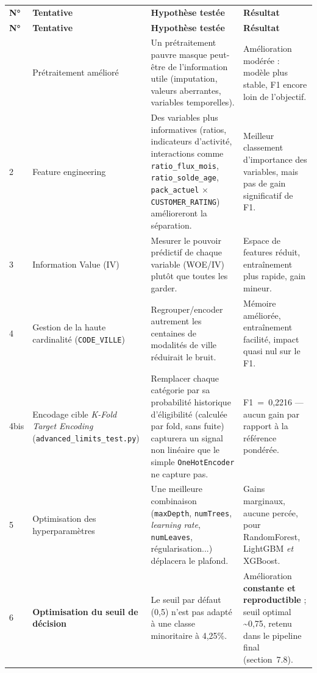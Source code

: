 \documentclass[11pt,a4paper]{report}
\let\oldtoprule\toprule
\renewcommand{\toprule}{\arrayrulecolor{corpslate}\oldtoprule\arrayrulecolor{black}}
\let\oldmidrule\midrule
\renewcommand{\midrule}{\arrayrulecolor{emsigreen}\oldmidrule\arrayrulecolor{black}}
\begin{document}
\begin{center}
\begin{longtable}{@{}p{0.7cm}p{3.4cm}p{5.3cm}p{5.3cm}@{}}
\toprule
\rowcolor{corpslate!10}
\textbf{N°} & \textbf{Tentative} & \textbf{Hypothèse testée} & \textbf{Résultat} \\
\midrule
\endfirsthead
\toprule
\rowcolor{corpslate!10}
\textbf{N°} & \textbf{Tentative} & \textbf{Hypothèse testée} & \textbf{Résultat} \\
\midrule
\endhead
1 & Prétraitement amélioré & Un prétraitement pauvre masque peut-être de l'information utile (imputation, valeurs aberrantes, variables temporelles). & Amélioration modérée : modèle plus stable, F1 encore loin de l'objectif. \\
2 & Feature engineering & Des variables plus informatives (ratios, indicateurs d'activité, interactions comme \texttt{ratio\_flux\_mois}, \texttt{ratio\_solde\_age}, \texttt{pack\_actuel} $\times$ \texttt{CUSTOMER\_RATING}) amélioreront la séparation. & Meilleur classement d'importance des variables, mais pas de gain significatif de F1. \\
3 & Information Value (IV) & Mesurer le pouvoir prédictif de chaque variable (WOE/IV) plutôt que toutes les garder. & Espace de features réduit, entraînement plus rapide, gain mineur. \\
4 & Gestion de la haute cardinalité (\texttt{CODE\_VILLE}) & Regrouper/encoder autrement les centaines de modalités de ville réduirait le bruit. & Mémoire améliorée, entraînement facilité, impact quasi nul sur le F1. \\
4bis & Encodage cible \textit{K-Fold Target Encoding} (\texttt{advanced\_limits\_test.py}) & Remplacer chaque catégorie par sa probabilité historique d'éligibilité (calculée par fold, sans fuite) capturera un signal non linéaire que le simple \texttt{OneHotEncoder} ne capture pas. & F1~=~0,2216 — aucun gain par rapport à la référence pondérée. \\
5 & Optimisation des hyperparamètres & Une meilleure combinaison (\texttt{maxDepth}, \texttt{numTrees}, \textit{learning rate}, \texttt{numLeaves}, régularisation...) déplacera le plafond. & Gains marginaux, aucune percée, pour RandomForest, LightGBM \emph{et} XGBoost. \\
6 & \textbf{Optimisation du seuil de décision} & Le seuil par défaut (0,5) n'est pas adapté à une classe minoritaire à 4,25\%. & Amélioration \textbf{constante et reproductible} ; seuil optimal \textasciitilde 0,75, retenu dans le pipeline final (section~7.8). \\

\end{longtable}
\end{center}
\end{document}
